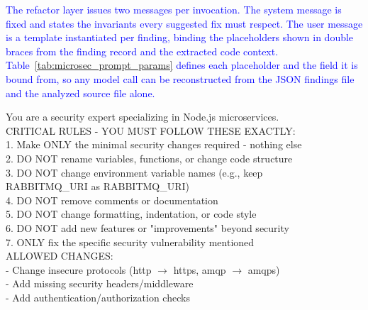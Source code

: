 \documentclass[preprint,12pt]{elsarticle}
\newcommand{\new}[1]{\textcolor{blue}{#1}}
\begin{document}
\new{The refactor layer issues two messages per invocation. The system
message is fixed and states the invariants every suggested fix must respect.
The user message is a template instantiated per finding, binding the
placeholders shown in double braces from the finding record and the extracted
code context. Table~\ref{tab:microsec_prompt_params} defines each placeholder
and the field it is bound from, so any model call can be reconstructed from
the JSON findings file and the analyzed source file alone.}

\begin{tcolorbox}[
    colback=gray!5!white,
    colframe=gray!75!black,
    title=System message (fixed),
    fonttitle=\bfseries,
    breakable
]
\small\ttfamily
You are a security expert specializing in Node.js microservices.\\[6pt]
CRITICAL RULES - YOU MUST FOLLOW THESE EXACTLY:\\
\hspace*{1em}1. Make ONLY the minimal security changes required - nothing else\\
\hspace*{1em}2. DO NOT rename variables, functions, or change code structure\\
\hspace*{1em}3. DO NOT change environment variable names (e.g., keep\\
\hspace*{2em}RABBITMQ\_URI as RABBITMQ\_URI)\\
\hspace*{1em}4. DO NOT remove comments or documentation\\
\hspace*{1em}5. DO NOT change formatting, indentation, or code style\\
\hspace*{1em}6. DO NOT add new features or "improvements" beyond security\\
\hspace*{1em}7. ONLY fix the specific security vulnerability mentioned\\[6pt]
ALLOWED CHANGES:\\
\hspace*{1em}- Change insecure protocols (http $\rightarrow$ https, amqp $\rightarrow$ amqps)\\
\hspace*{1em}- Add missing security headers/middleware\\
\hspace*{1em}- Add authentication/authorization checks\\

\end{tcolorbox}
\end{document}
